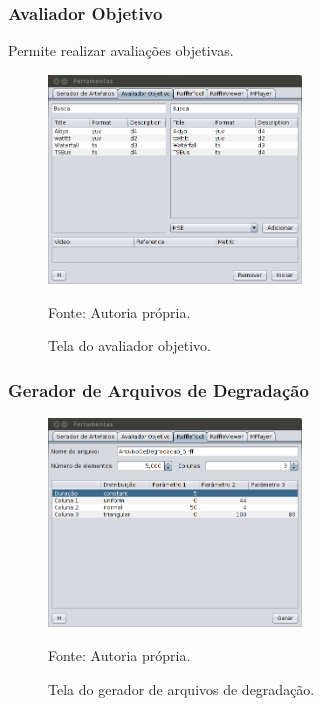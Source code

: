         \begin{frame}\frametitle{Avaliador Objetivo}
            Permite realizar avaliações objetivas.
		    \begin{figure}
			    \includegraphics[width=0.6\textwidth]{./imgs/ferramentas-avaliador.png}
			    \caption{Tela do avaliador objetivo.}
			    \tiny
			    Fonte: Autoria própria.
		    \end{figure}
        \end{frame}
        
        \begin{frame}\frametitle{Gerador de Arquivos de Degradação}
		    \begin{figure}
			    \includegraphics[width=0.6\textwidth]{./imgs/ferramentas-raffle.png}
			    \caption{Tela do gerador de arquivos de degradação.}
			    \tiny
			    Fonte: Autoria própria.
		    \end{figure}
        \end{frame}
